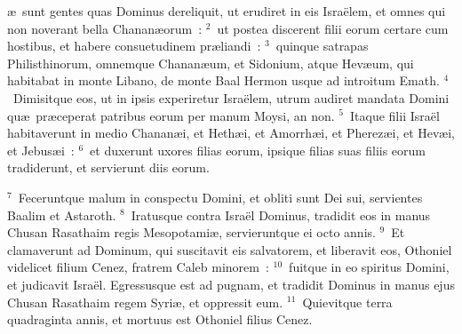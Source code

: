 \bchapter
{}\ae\ sunt gentes quas Dominus dereliquit, ut erudiret in eis Isra\"elem, et omnes qui non noverant bella Chanan\ae orum~:
${}^{2}$~ut postea discerent filii eorum certare cum hostibus, et habere consuetudinem pr\ae liandi~:
${}^{3}$~quinque satrapas Philisthinorum, omnemque Chanan\ae um, et Sidonium, atque Hev\ae um, qui habitabat in monte Libano, de monte Baal Hermon usque ad introitum Emath.
${}^{4}$~Dimisitque eos, ut in ipsis experiretur Isra\"elem, utrum audiret mandata Domini qu\ae\ pr\ae ceperat patribus eorum per manum Moysi, an non.
${}^{5}$~Itaque filii Isra\"el habitaverunt in medio Chanan\ae i, et Heth\ae i, et Amorrh\ae i, et Pherez\ae i, et Hev\ae i, et Jebus\ae i~:
${}^{6}$~et duxerunt uxores filias eorum, ipsique filias suas filiis eorum tradiderunt, et servierunt diis eorum.


${}^{7}$~Feceruntque malum in conspectu Domini, et obliti sunt Dei sui, servientes Baalim et Astaroth.
${}^{8}$~Iratusque contra Isra\"el Dominus, tradidit eos in manus Chusan Rasathaim regis Mesopotami\ae , servieruntque ei octo annis.
${}^{9}$~Et clamaverunt ad Dominum, qui suscitavit eis salvatorem, et liberavit eos, Othoniel videlicet filium Cenez, fratrem Caleb minorem~:
${}^{10}$~fuitque in eo spiritus Domini, et judicavit Isra\"el. Egressusque est ad pugnam, et tradidit Dominus in manus ejus Chusan Rasathaim regem Syri\ae , et oppressit eum.
${}^{11}$~Quievitque terra quadraginta annis, et mortuus est Othoniel filius Cenez.


